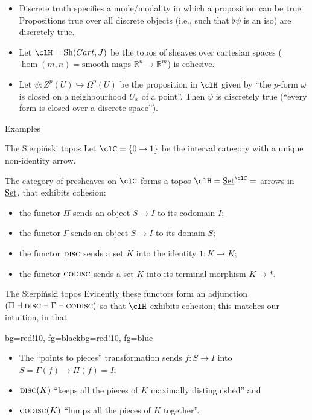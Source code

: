 \documentclass[presentation]{beamer}
\begin{document}
%
%
%
%
%
%
%
\begin{frame}
	\begin{itemize}
		\item<+-> Discrete truth specifies a \alert{mode/modality} in which a proposition can be true. Propositions true over all discrete objects (i.e., such that $\flat\psi$ is an iso) are discretely true.
		\item<+-> Let $\clH = \text{Sh}(Cart,J)$ be the topos of sheaves over cartesian spaces ($\hom(m,n) = \text{smooth maps }\mathbb{R}^n\to \mathbb{R}^m$) is cohesive. \item<+-> Let $\psi\colon Z^p(U) \hookrightarrow \Omega^p(U)$ be the proposition in $\clH$ given by ``the $p$-form $\omega$ is closed on a neighbourhood $U_x$ of a point''. Then $\psi$ is discretely true (``every form is closed over a discrete space'').
	\end{itemize}
\end{frame}
%
%
%
%
%
%
%
\begin{frame}
	\Huge
	\centering
	Examples
\end{frame}
%
%
%
%
%
%
%
\begin{frame}{The Sierpiński topos}
	Let $\clC = \{0\to 1\}$ be the interval category with a unique non-identity arrow.
	\onslide<+->

	\medskip

	The category of \alert{presheaves} on $\clC$ forms a topos $\clH=\Set^{\clC} =$ arrows in $\underline{\text{Set}}$, that exhibits cohesion:
	\begin{itemize}
		\item<+-> the functor \alert{$\Pi$} sends an object $S\to I$ to its \alert{codomain} $I$;
		\item<+-> the functor \alert{$\Gamma$} sends an object $S\to I$ to its \alert{domain} $S$;
		\item<+-> the functor \alert{$\textsc{disc}$} sends a set $K$ into the \alert{identity} $1\colon K\to K$;
		\item<+-> the functor \alert{$\textsc{codisc}$} sends a set $K$ into its \alert{terminal} morphism $K\to *$.
	\end{itemize}
\end{frame}
%
%
%
%
%
%
%
\begin{frame}{The Sierpiński topos}
	Evidently these functors form an adjunction $(\Pi\dashv\textsc{disc}\dashv\Gamma\dashv\textsc{codisc})$ so that $\clH$ exhibits cohesion; this matches our intuition, in that
	\begin{variableblock}{}{bg=red!10, fg=black}{bg=red!10, fg=blue}
		\begin{itemize}
			\item The ``points to pieces'' transformation sends $f : S\to I$ into $S = \Gamma(f) \to \Pi(f)=I$;
			\item $\textsc{disc}(K)$ ``keeps all the pieces of $K$ maximally distinguished'' and
			\item $\textsc{codisc}(K)$ ``lumps all the pieces of $K$ together''.
		\end{itemize}
	\end{variableblock}
\end{frame}
\end{document}
